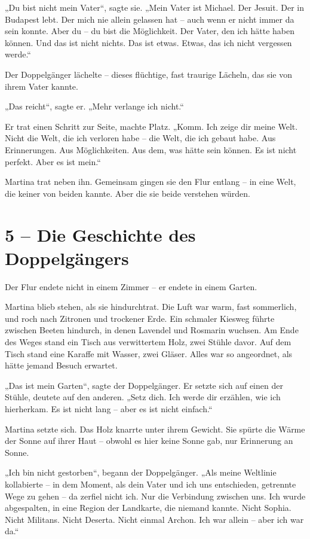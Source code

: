 \documentclass[
]{article}
\begin{document}
„Du bist nicht mein Vater``, sagte sie. „Mein Vater ist Michael. Der Jesuit. Der in Budapest lebt. Der mich nie allein gelassen hat -- auch wenn er nicht immer da sein konnte. Aber du -- du bist die Möglichkeit. Der Vater, den ich hätte haben können. Und das ist nicht nichts. Das ist etwas. Etwas, das ich nicht vergessen werde.``

Der Doppelgänger lächelte -- dieses flüchtige, fast traurige Lächeln, das sie von ihrem Vater kannte.

„Das reicht``, sagte er. „Mehr verlange ich nicht.``

Er trat einen Schritt zur Seite, machte Platz. „Komm. Ich zeige dir meine Welt. Nicht die Welt, die ich verloren habe -- die Welt, die ich gebaut habe. Aus Erinnerungen. Aus Möglichkeiten. Aus dem, was hätte sein können. Es ist nicht perfekt. Aber es ist mein.``

Martina trat neben ihn. Gemeinsam gingen sie den Flur entlang -- in eine Welt, die keiner von beiden kannte. Aber die sie beide verstehen würden.

\section{5 -- Die Geschichte des Doppelgängers}\label{die-geschichte-des-doppelguxe4ngers}

Der Flur endete nicht in einem Zimmer -- er endete in einem Garten.

Martina blieb stehen, als sie hindurchtrat. Die Luft war warm, fast sommerlich, und roch nach Zitronen und trockener Erde. Ein schmaler Kiesweg führte zwischen Beeten hindurch, in denen Lavendel und Rosmarin wuchsen. Am Ende des Weges stand ein Tisch aus verwittertem Holz, zwei Stühle davor. Auf dem Tisch stand eine Karaffe mit Wasser, zwei Gläser. Alles war so angeordnet, als hätte jemand Besuch erwartet.

„Das ist mein Garten``, sagte der Doppelgänger. Er setzte sich auf einen der Stühle, deutete auf den anderen. „Setz dich. Ich werde dir erzählen, wie ich hierherkam. Es ist nicht lang -- aber es ist nicht einfach.``

Martina setzte sich. Das Holz knarrte unter ihrem Gewicht. Sie spürte die Wärme der Sonne auf ihrer Haut -- obwohl es hier keine Sonne gab, nur Erinnerung an Sonne.

„Ich bin nicht gestorben``, begann der Doppelgänger. „Als meine Weltlinie kollabierte -- in dem Moment, als dein Vater und ich uns entschieden, getrennte Wege zu gehen -- da zerfiel nicht ich. Nur die Verbindung zwischen uns. Ich wurde abgespalten, in eine Region der Landkarte, die niemand kannte. Nicht Sophia. Nicht Militans. Nicht Deserta. Nicht einmal Archon. Ich war allein -- aber ich war da.``
\end{document}
